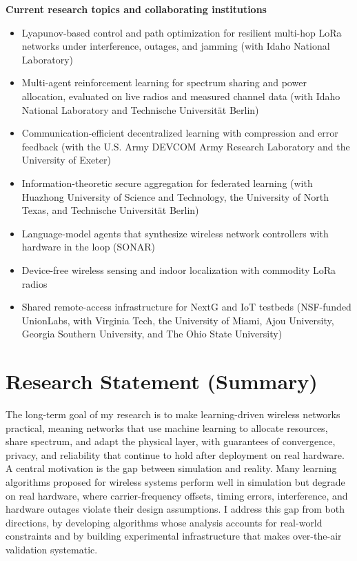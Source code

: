 \documentclass[10pt]{article}
\begin{document}
\textbf{Current research topics and collaborating institutions}
\begin{itemize}
\item Lyapunov-based control and path optimization for resilient multi-hop LoRa networks under interference, outages, and jamming (with Idaho National Laboratory)
\item Multi-agent reinforcement learning for spectrum sharing and power allocation, evaluated on live radios and measured channel data (with Idaho National Laboratory and Technische Universit\"at Berlin)
\item Communication-efficient decentralized learning with compression and error feedback (with the U.S. Army DEVCOM Army Research Laboratory and the University of Exeter)
\item Information-theoretic secure aggregation for federated learning (with Huazhong University of Science and Technology, the University of North Texas, and Technische Universit\"at Berlin)
\item Language-model agents that synthesize wireless network controllers with hardware in the loop (SONAR)
\item Device-free wireless sensing and indoor localization with commodity LoRa radios
\item Shared remote-access infrastructure for NextG and IoT testbeds (NSF-funded UnionLabs, with Virginia Tech, the University of Miami, Ajou University, Georgia Southern University, and The Ohio State University)
\end{itemize}

\section*{Research Statement (Summary)}
The long-term goal of my research is to make learning-driven wireless networks practical, meaning networks that use machine learning to allocate resources, share spectrum, and adapt the physical layer, with guarantees of convergence, privacy, and reliability that continue to hold after deployment on real hardware. A central motivation is the gap between simulation and reality. Many learning algorithms proposed for wireless systems perform well in simulation but degrade on real hardware, where carrier-frequency offsets, timing errors, interference, and hardware outages violate their design assumptions. I address this gap from both directions, by developing algorithms whose analysis accounts for real-world constraints and by building experimental infrastructure that makes over-the-air validation systematic.
\end{document}
